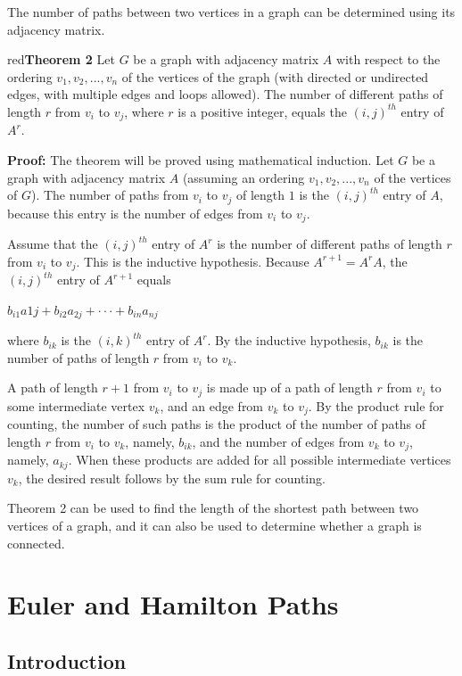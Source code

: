 \documentclass[11pt]{article}
\newenvironment{theorem}[1]{\begin{mybox}{red}{\textbf{Theorem #1}}}{\end{mybox}}
\begin{document}
The number of paths between two vertices in a graph can be determined using its adjacency matrix.

\begin{theorem}{2}
Let $G$ be a graph with adjacency matrix $A$ with respect to the ordering $v_1, v_2, ..., v_n$ of the vertices of the graph (with directed or undirected edges, with multiple edges and loops allowed). The number of different paths of length $r$ from $v_i$ to $v_j$, where $r$ is a positive integer, equals the $(i, j)^{th}$ entry of $A^r$.
\end{theorem}

\textbf{Proof:} The theorem will be proved using mathematical induction. Let $G$ be a graph with adjacency matrix $A$ (assuming an ordering $v_1, v_2, ..., v_n$ of the vertices of $G$). The number of paths from $v_i$ to $v_j$ of length $1$ is the $(i, j)^{th}$ entry of $A$, because this entry is the number of edges from $v_i$ to $v_j$.

Assume that the $(i, j)^{th}$ entry of $A^r$ is the number of different paths of length $r$ from $v_i$ to $v_j$. This is the inductive hypothesis. Because $A^{r+1} = A^{r}A$, the $(i, j)^{th}$ entry of $A^{r+1}$ equals

$b_{i1}a{1j} + b_{i2}a_{2j} + \cdot \cdot \cdot + b_{in}a_{nj}$

\noindent where $b_{ik}$ is the $(i, k)^{th}$ entry of $A^r$. By the inductive hypothesis, $b_{ik}$ is the number of paths of length $r$ from $v_i$ to $v_k$.

A path of length $r + 1$ from $v_i$ to $v_j$ is made up of a path of length $r$ from $v_i$ to some intermediate vertex $v_k$, and an edge from $v_k$ to $v_j$. By the product rule for counting, the number of such paths is the product of the number of paths of length $r$ from $v_i$ to $v_k$, namely, $b_{ik}$, and the number of edges from $v_k$ to $v_j$, namely, $a_{kj}$. When these products are added for all possible intermediate vertices $v_k$, the desired result follows by the sum rule for counting.

Theorem 2 can be used to find the length of the shortest path between two vertices of a graph, and it can also be used to determine whether a graph is connected.

\section{Euler and Hamilton Paths}

\subsection{Introduction}
\end{document}
